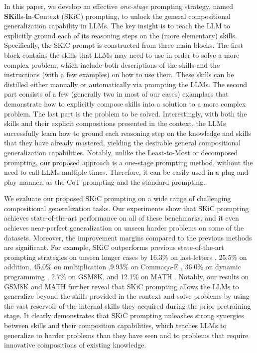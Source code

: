\documentclass{article} \usepackage{arxiv}
\begin{document}
In this paper, we develop an effective \emph{one-stage} prompting strategy, named \textbf{SK}ills-\textbf{i}n-\textbf{C}ontext (SKiC) prompting, to unlock the general compositional generalization capability in LLMs. The key insight is to teach the LLM to explicitly ground each of its reasoning steps on the (more elementary) skills. Specifically, the SKiC prompt is constructed from three main blocks. The first block contains the skills that LLMs may need to use in order to solve a more complex problem, which include both descriptions of the skills and the instructions (with a few examples) on how to use them. These skills can be distilled either manually or automatically via prompting the LLMs. The second part consists of a few (generally two in most of our cases) examplars that demonstrate how to explicitly compose skills into a solution to a more complex problem. The last part is the problem to be solved. Interestingly, with both the skills and their explicit compositions presented in the context, the LLMs successfully learn how to ground each reasoning step on the knowledge and skills that they have already mastered, yielding the desirable general compositional generalization capabilities. Notably, unlike the Least-to-Most or decomposed prompting, our proposed approach is a one-stage prompting method, without the need to call LLMs multiple times. Therefore, it can be easily used in a plug-and-play manner, as the CoT prompting and the standard prompting.




We evaluate our proposed SKiC prompting on a wide range of challenging compositional generalization tasks. Our experiments show that SKiC prompting achieves state-of-the-art performance on all of these benchmarks, and it even achieves near-perfect generalization on unseen harder problems on some of the datasets. Moreover, the improvement margins compared to the previous methods are significant. For example, SKiC outperforms previous state-of-the-art prompting strategies on unseen longer cases by 16.3\% on last-letters \citep{zhou2022least}, 25.5\% on addition, 45.0\% on multiplication \citep{dziri2023faith},9.93\% on Commaqa-E \citep{khot2021hey}, 36.0\% on dynamic programming \citep{dziri2023faith}, 2.7\% on GSM8K\citep{cobbe2021training}, and 12.1\% on MATH \citep{hendrycks2021measuring}. Notably, our results on GSM8K and MATH further reveal that SKiC prompting allows the LLMs to generalize beyond the skills provided in the context and solve problems by using the vast reservoir of the internal skills they acquired during the prior pretraining stage. It clearly demonstrates that SKiC prompting unleashes strong synergies between skills and their composition capabilities, which teaches LLMs to generalize to harder problems than they have seen and to problems that require innovative compositions of existing knowledge.
\end{document}
